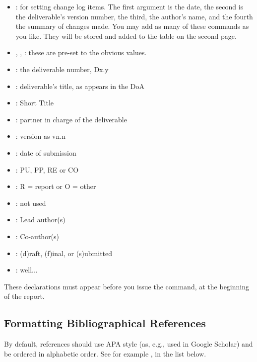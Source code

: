 \begin{itemize}
    \item {}: for setting change log items. The first argument is the date, the second is the deliverable's version number, the third, the author's name, and the   fourth the summary of changes made. You may add as many of these   commands as you like. They will be stored and added to the table on   the second page.  
    \item {}, , : these are pre-set to the obvious values. 
    \item {}: the deliverable number, Dx.y
    \item {}: deliverable's title, as appears in the DoA
    \item {}: Short Title
    \item {}: partner in charge of the deliverable
    \item {}: version as vn.n
    \item {}: date of submission
    \item {}: PU, PP, RE or CO
    \item {}: R = report or O = other
    \item {}: not used
    \item {}: Lead author(s)
    \item {}: Co-author(s)
    \item {}: (d)raft, (f)inal, or (s)ubmitted
    \item {}: well...
\end{itemize}

These declarations must appear before you issue the  command, at the beginning of the report.

\subsection{Formatting Bibliographical References}
\label{sec:formatting-bibliographical-references}

By default, references should use APA style (as, e.g., used in Google Scholar) and be ordered in alphabetic order. See for example \cite{bib:tan2004}, in the list below.

